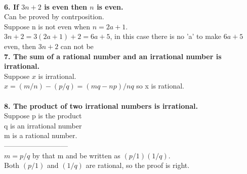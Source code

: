 \documentclass[11pt]{article}
\begin{document}
\\
\textbf{6. If $3n+2$ is even then $n$ is even.}\\
Can be proved by contrposition.\\
Suppose n is not even when $n=2a+1$.\\
$3n+2=3(2a+1)+2=6a+5$, in this case there is no 'a' to make $6a+5$ even, then $3n+2$ can not be \\
\textbf{7. The sum of a rational number and an irrational number is irrational.}\\
Suppose $x$ is irrational.\\
$x=(m/n)-(p/q)=(mq-np)/nq$ so x is rational.\\
\\
\textbf{8. The product of two irrational numbers is irrational.}\\
Suppose p is the product\\
q is an irrational number\\
m is a rational number.\\
---------------------------\\
$m=p/q$ by that m and be written as $(p/1)(1/q)$.\\
Both $(p/1)$ and $(1/q)$ are rational, so the proof is right.\\
\end{document}
